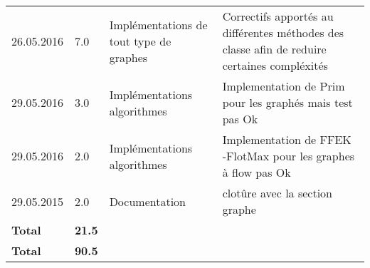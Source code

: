 \documentclass[french]{article}
\begin{document}
\begin{longtable}{p{}|p{}|p{}|p{}}
                26.05.2016 & 7.0 & Implémentations de tout type de graphes &Correctifs apportés au différentes méthodes des classe afin de reduire certaines compléxités\\
                29.05.2016 & 3.0 & Implémentations algorithmes &Implementation de Prim pour les graphés mais test pas Ok\\
                29.05.2016 & 2.0 & Implémentations algorithmes &Implementation de FFEK -FlotMax pour les graphes à flow  pas Ok\\
                29.05.2015 & 2.0 & Documentation & clotûre avec la section graphe\\
               \textbf{Total} & \textbf{21.5} &&\\
		\hline
                \textbf{Total} & \textbf{90.5} &&\\
                \hline 
                \hline
	\end{longtable}
	
\end{document}
